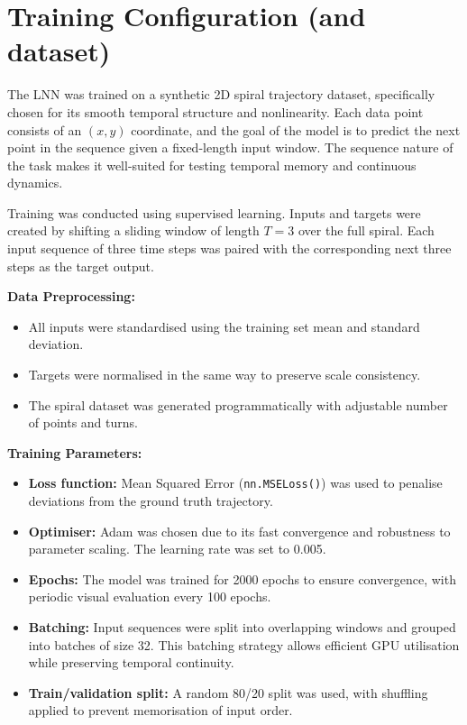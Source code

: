 \section{Training Configuration (and dataset)}
The LNN was trained on a synthetic 2D spiral trajectory dataset, specifically chosen for its smooth temporal structure and nonlinearity. Each data point consists of an $(x, y)$ coordinate, and the goal of the model is to predict the next point in the sequence given a fixed-length input window. The sequence nature of the task makes it well-suited for testing temporal memory and continuous dynamics.

Training was conducted using supervised learning. Inputs and targets were created by shifting a sliding window of length $T = 3$ over the full spiral. Each input sequence of three time steps was paired with the corresponding next three steps as the target output.

\vspace{1em}
\noindent \textbf{Data Preprocessing:}
\begin{itemize}
    \item All inputs were standardised using the training set mean and standard deviation.
    \item Targets were normalised in the same way to preserve scale consistency.
    \item The spiral dataset was generated programmatically with adjustable number of points and turns.
\end{itemize}

\vspace{0.5em}
\noindent \textbf{Training Parameters:}
\begin{itemize}
    \item \textbf{Loss function:} Mean Squared Error (\texttt{nn.MSELoss()}) was used to penalise deviations from the ground truth trajectory.
    \item \textbf{Optimiser:} Adam was chosen due to its fast convergence and robustness to parameter scaling. The learning rate was set to 0.005.
    \item \textbf{Epochs:} The model was trained for 2000 epochs to ensure convergence, with periodic visual evaluation every 100 epochs.
    \item \textbf{Batching:} Input sequences were split into overlapping windows and grouped into batches of size 32. This batching strategy allows efficient GPU utilisation while preserving temporal continuity.
    \item \textbf{Train/validation split:} A random 80/20 split was used, with shuffling applied to prevent memorisation of input order.
\end{itemize}

